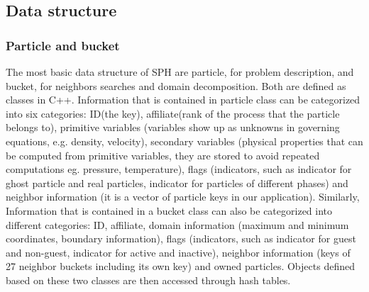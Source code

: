\documentclass[conference,compsoc]{IEEEtran}
\begin{document}
\subsection{Data structure}
\subsubsection{Particle and bucket}
The most basic data structure of SPH are particle, for problem description, and bucket, for neighbors searches and domain decomposition. Both are defined as classes in C++. Information that is contained in particle class can be categorized into six categories: ID(the key), affiliate(rank of the process that the particle belongs to), primitive variables (variables show up as unknowns in governing equations, e.g. density, velocity), secondary variables (physical properties that can be computed from primitive variables, they are stored to avoid repeated computations eg. pressure, temperature), flags (indicators, such as indicator for ghost particle and real particles, indicator for particles of different phases) and neighbor information (it is a vector of particle keys in our application). Similarly,  Information that is contained in  a bucket class can also be categorized into different categories: ID, affiliate, domain information (maximum and minimum coordinates, boundary information), flags (indicators, such as indicator for guest and non-guest, indicator for active and inactive), neighbor information (keys of 27 neighbor buckets including its own key) and owned particles. Objects defined based on these two classes are then accessed through hash tables.
\end{document}
